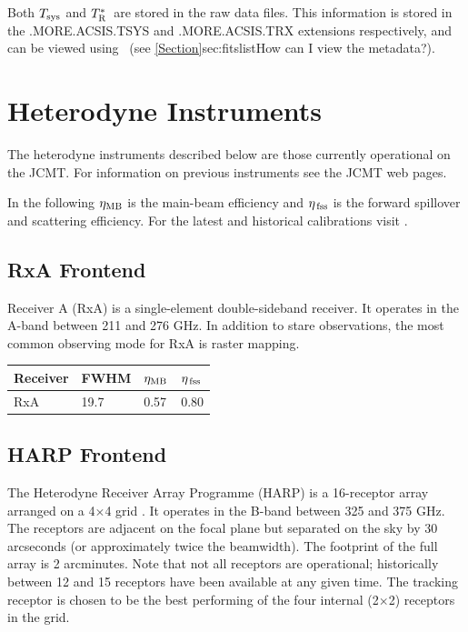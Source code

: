 \documentclass[11pt,oneside,chapters]{starlink}
\newcommand{\uarcs}{\hspace{-0.27em}\arcsec\hspace{-0.07em}}
\newcommand{\uarcs}{$''$}
\newcommand{\trs}{$T_{\textnormal{R}}^{*}$}
\begin{document}
\begin{tip}
Both $T_{\textnormal{sys}}$ and \trs\ are stored in
the raw data files. This information is stored in the .MORE.ACSIS.TSYS
and .MORE.ACSIS.TRX extensions respectively, and can be viewed using
\HDSTRACE\ (see \cref{Section}{sec:fitslist}{How can I view the
metadata?}).
\end{tip}


\section{Heterodyne Instruments}
\label{sec:instruments}

The heterodyne instruments described below are those currently operational
on the JCMT. For information on previous instruments see the JCMT web pages.

In the following $\eta_{\textnormal{MB}}$ is the main-beam efficiency and
$\eta_{\textnormal{\,fss}}$ is the forward spillover and scattering efficiency. 
For the latest and historical calibrations visit
.

\subsection{RxA Frontend}

Receiver A (RxA) is a single-element double-sideband receiver. It
operates in the A-band between 211 and 276 GHz. In addition to stare
observations, the most common observing mode for RxA is raster
mapping.
\begin{table}[h!]
\begin{center}
\begin{tabular}{|p{1.5cm}|p{1.2cm}|p{0.8cm}|p{0.8cm}|}
\hline
Receiver &FWHM & $\eta_{\textnormal{MB}}$ & $\eta_{\textnormal{\,fss}}$\\
\hline
RxA&19.\uarcs7&0.57 & 0.80\\
\hline
\end{tabular}
\end{center}
\end{table}


\subsection{HARP Frontend}

The Heterodyne Receiver Array Programme (HARP) is a 16-receptor array
arranged on a 4$\times$4 grid \cite{harp}. It operates in the B-band
between 325 and 375 GHz. The receptors are adjacent on the focal plane
but separated on the sky by 30 arcseconds (or approximately twice the
beamwidth). The footprint of the full array is 2 arcminutes.  Note
that not all receptors are operational; historically between 12 and 15
receptors have been available at any given time. The tracking receptor
is chosen to be the best performing of the four internal (2$\times$2)
receptors in the grid.
\end{document}
